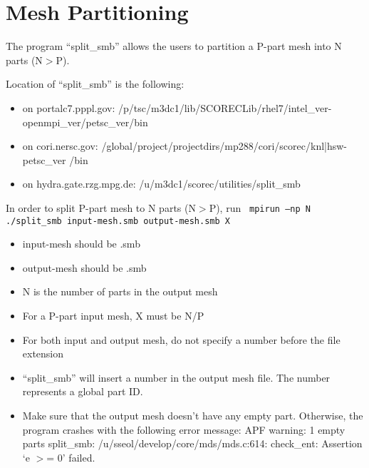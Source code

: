 \section{Mesh Partitioning}

The program “split\_smb” allows the users to partition a P-part mesh into N parts (N$>$P). 

Location of “split\_smb” is the following:
\begin{itemize}
\item	on portalc7.pppl.gov: /p/tsc/m3dc1/lib/SCORECLib/rhel7/intel\_ver-openmpi\_ver/petsc\_ver/bin
\item	on cori.nersc.gov:  /global/project/projectdirs/mp288/cori/scorec/knl|hsw-petsc\_ver /bin
\item	on hydra.gate.rzg.mpg.de: /u/m3dc1/scorec/utilities/split\_smb
\end{itemize}

In order to split P-part mesh to N parts (N$>$P), run
\texttt{
mpirun –np N ./split\_smb input-mesh.smb output-mesh.smb X 
}
\begin{itemize}
\item	input-mesh should be .smb 
\item	output-mesh should be .smb
\item	N is the number of parts in the output mesh
\item	For a P-part input mesh, X must be N/P
\item	For both input and output mesh, do not specify a number before the file extension
\item	“split\_smb” will insert a number in the output mesh file. The number represents a global part ID.
\item	Make sure that the output mesh doesn’t have any empty part. Otherwise, the program crashes with the following error message:
\newline
APF warning: 1 empty parts
\newline
split\_smb: /u/sseol/develop/core/mds/mds.c:614: check\_ent: Assertion `e $>$= 0' failed.
\end{itemize}

